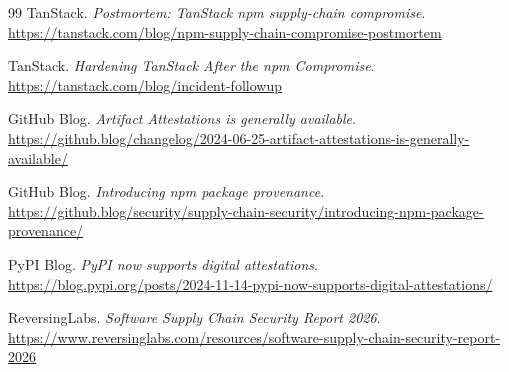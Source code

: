 \documentclass[12pt,a4paper]{article}
\begin{document}
\begin{thebibliography}{99}
TanStack.
\textit{Postmortem: TanStack npm supply-chain compromise}.
\url{https://tanstack.com/blog/npm-supply-chain-compromise-postmortem}

TanStack.
\textit{Hardening TanStack After the npm Compromise}.
\url{https://tanstack.com/blog/incident-followup}

GitHub Blog.
\textit{Artifact Attestations is generally available}.
\url{https://github.blog/changelog/2024-06-25-artifact-attestations-is-generally-available/}

GitHub Blog.
\textit{Introducing npm package provenance}.
\url{https://github.blog/security/supply-chain-security/introducing-npm-package-provenance/}

PyPI Blog.
\textit{PyPI now supports digital attestations}.
\url{https://blog.pypi.org/posts/2024-11-14-pypi-now-supports-digital-attestations/}

ReversingLabs.
\textit{Software Supply Chain Security Report 2026}.
\url{https://www.reversinglabs.com/resources/software-supply-chain-security-report-2026}

\end{thebibliography}
\end{document}
